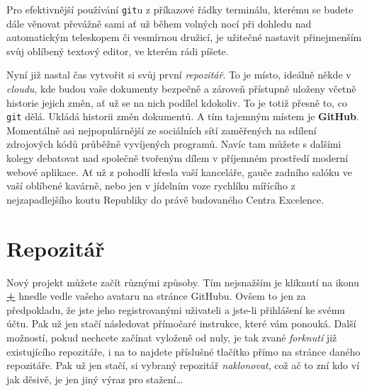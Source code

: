 \documentclass{report}
\newenvironment{Shaded}{}{}
\newcommand{\KeywordTok}[1]{\textcolor[rgb]{0.00,0.44,0.13}{\textbf{{#1}}}}
\newcommand{\NormalTok}[1]{{#1}}
\begin{document}
Pro efektivnější používání \texttt{git}u z příkazové řádky terminálu,
kterému se budete dále věnovat převážně sami ať už během volných nocí
při dohledu nad automatickým teleskopem či vesmírnou družicí, je
užitečné nastavit přinejmenším svůj oblíbený textový editor, ve kterém
rádi píšete.

\begin{Shaded}
\end{Shaded}

Nyní již nastal čas vytvořit si svůj první \emph{repozitář}. To je
místo, ideálně někde v \emph{cloudu}, kde budou vaše dokumenty bezpečně
a zároveň přístupně uloženy včetně historie jejich změn, ať už se na
nich podílel kdokoliv. To je totiž přesně to, co \texttt{git} dělá.
Ukládá historii změn dokumentů. A tím tajemným místem je
\textbf{GitHub}. Momentálně asi nejpopulárnější ze sociálních sítí
zaměřených na sdílení zdrojových kódů průběžně vyvíjených programů.
Navíc tam můžete s dalšími kolegy debatovat nad společně tvořeným dílem
v příjemném prostředí moderní webové aplikace. Ať už z pohodlí křesla
vaší kanceláře, gauče zadního salóku ve vaší oblíbené kavárně, nebo jen
v jídelním voze rychlíku mířícího z nejzapadlejšího koutu Republiky do
právě budovaného Centra Excelence.

    \section*{Repozitář}\label{repozituxe1ux159}

Nový projekt můžete začít různými způsoby. Tím nejsnažším je kliknutí na
ikonu \href{https://github.com/new}{\textbf{+}} hnedle vedle vašeho
avataru na stránce GitHubu. Ovšem to jen za předpokladu, že jste jeho
registrovanými uživateli a jste-li přihlášení ke svému účtu. Pak už jen
stačí následovat přímočaré instrukce, které vám ponouká. Další možností,
pokud nechcete začínat vyloženě od nuly, je tak zvané \emph{forknutí}
již existujícího repozitáře, i na to najdete příslušné tlačítko přímo na
stránce daného repozitáře. Pak už jen stačí, si vybraný repozitář
\emph{naklonovat}, což ač to zní kdo ví jak děsivě, je jen jiný výraz
pro stažení\ldots{}

\begin{Shaded}
\end{Shaded}
\end{document}
